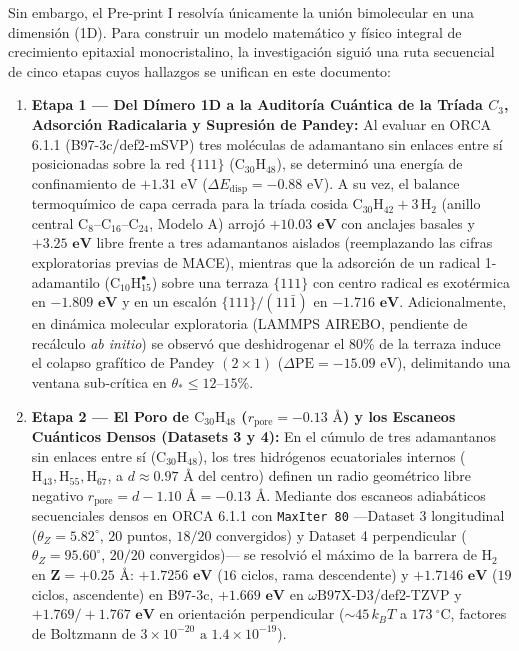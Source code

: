 \documentclass[10pt,twocolumn,a4paper]{article}
\begin{document}
Sin embargo, el Pre-print I resolvía únicamente la unión bimolecular en una dimensión (1D). Para construir un modelo matemático y físico integral de crecimiento epitaxial monocristalino, la investigación siguió una ruta secuencial de cinco etapas cuyos hallazgos se unifican en este documento:

\begin{enumerate}
    \item \textbf{Etapa 1 — Del Dímero 1D a la Auditoría Cuántica de la Tríada $C_3$, Adsorción Radicalaria y Supresión de Pandey:} Al evaluar en ORCA 6.1.1 (B97-3c/def2-mSVP) tres moléculas de adamantano sin enlaces entre sí posicionadas sobre la red $\{111\}$ ($\text{C}_{30}\text{H}_{48}$), se determinó una energía de confinamiento de $+1.31\text{ eV}$ ($\Delta E_{\text{disp}} = -0.88\text{ eV}$). A su vez, el balance termoquímico de capa cerrada para la tríada cosida $\text{C}_{30}\text{H}_{42} + 3\,\text{H}_2$ (anillo central $\text{C}_8\text{--C}_{16}\text{--C}_{24}$, Modelo A) arrojó $\mathbf{+10.03\text{ eV}}$ con anclajes basales y $\mathbf{+3.25\text{ eV}}$ libre frente a tres adamantanos aislados (reemplazando las cifras exploratorias previas de MACE), mientras que la adsorción de un radical 1-adamantilo ($\text{C}_{10}\text{H}_{15}^\bullet$) sobre una terraza $\{111\}$ con centro radical es exotérmica en $\mathbf{-1.809\text{ eV}}$ y en un escalón $\{111\}/(11\bar{1})$ en $\mathbf{-1.716\text{ eV}}$. Adicionalmente, en dinámica molecular exploratoria (LAMMPS AIREBO, pendiente de recálculo \textit{ab initio}) se observó que deshidrogenar el $80\%$ de la terraza induce el colapso grafítico de Pandey $(2\times 1)$ ($\Delta\text{PE} = -15.09\text{ eV}$), delimitando una ventana sub-crítica en $\theta_* \le 12\text{--}15\%$.
    \item \textbf{Etapa 2 — El Poro de $\text{C}_{30}\text{H}_{48}$ ($r_{\text{pore}} = -0.13\text{ \AA}$) y los Escaneos Cuánticos Densos (Datasets 3 y 4):} En el cúmulo de tres adamantanos sin enlaces entre sí ($\text{C}_{30}\text{H}_{48}$), los tres hidrógenos ecuatoriales internos ($\text{H}_{43}, \text{H}_{55}, \text{H}_{67}$, a $d \approx 0.97\text{ \AA}$ del centro) definen un radio geométrico libre negativo $r_{\text{pore}} = d - 1.10\text{ \AA} = \mathbf{-0.13\text{ \AA}}$. Mediante dos escaneos adiabáticos secuenciales densos en ORCA 6.1.1 con \texttt{MaxIter 80} —Dataset 3 longitudinal ($\theta_Z = 5.82^\circ$, $20$ puntos, $18/20$ convergidos) y Dataset 4 perpendicular ($\theta_Z = 95.60^\circ$, $20/20$ convergidos)— se resolvió el máximo de la barrera de $\text{H}_2$ en $\mathbf{Z = +0.25\text{ \AA}}$: $\mathbf{+1.7256\text{ eV}}$ ($16$ ciclos, rama descendente) y $\mathbf{+1.7146\text{ eV}}$ ($19$ ciclos, ascendente) en B97-3c, $\mathbf{+1.669\text{ eV}}$ en $\omega\text{B97X-D3}$/def2-TZVP y $\mathbf{+1.769 / +1.767\text{ eV}}$ en orientación perpendicular ($\sim 45\,k_B T$ a $173\ ^\circ\text{C}$, factores de Boltzmann de $3 \times 10^{-20}\text{ a }1.4 \times 10^{-19}$).

\end{enumerate}
\end{document}
